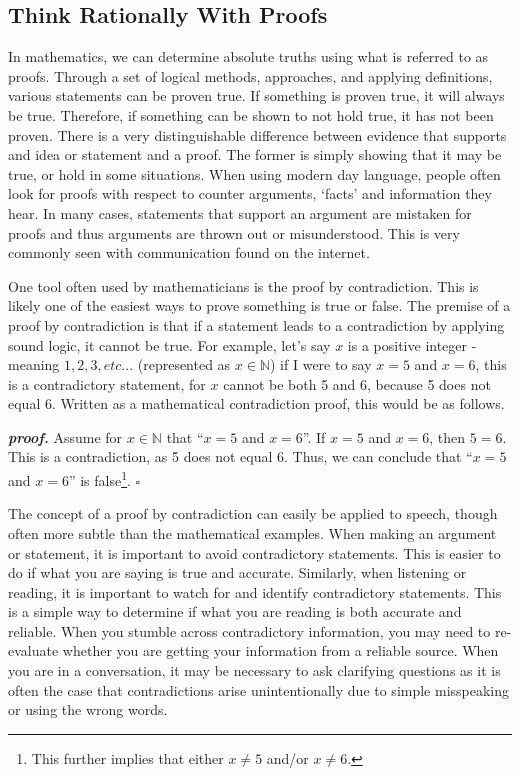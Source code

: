 \documentclass[10pt, a4paper, twocolumn]{book}
\begin{document}
\subsection{Think Rationally With Proofs}

In mathematics, we can determine absolute truths using what is referred to as proofs. Through a set of logical methods, approaches, and applying definitions, various statements can be proven true. If something is proven true, it will always be true. Therefore, if something can be shown to not hold true, it has not been proven. There is a very distinguishable difference between evidence that supports and idea or statement and a proof. The former is simply showing that it may be true, or hold in some situations. When using modern day language, people often look for proofs with respect to counter arguments, `facts' and information they hear. In many cases, statements that support an argument are mistaken for proofs and thus arguments are thrown out or misunderstood. This is very commonly seen with communication found on the internet.

One tool often used by mathematicians is the proof by contradiction. This is likely one of the easiest ways to prove something is true or false. The premise of a proof by contradiction is that if a statement leads to a contradiction by applying sound logic, it cannot be true. For example, let's say $x$ is a positive integer - meaning $1,2,3,etc...$ (represented as $x \in \mathbb{N}$) if I were to say $x=5$ and $x=6$, this is a contradictory statement, for $x$ cannot be both 5 and 6, because 5 does not equal 6. Written as a mathematical contradiction proof, this would be as follows.

\begin{fancybox}{}
	\textit{\textbf{proof.}} Assume for $x \in \mathbb{N}$ that ``$x=5$ and $x=6$''. If $x=5$ and $x=6$, then $5=6$. This is a contradiction, as 5 does not equal 6. Thus, we can conclude that ``$x=5$ and $x=6$'' is false\footnote{This further implies that either $x\neq5$ and/or $x\neq6$.}. $\square$
\end{fancybox}

The concept of a proof by contradiction can easily be applied to speech, though often more subtle than the mathematical examples. When making an argument or statement, it is important to avoid contradictory statements. This is easier to do if what you are saying is true and accurate. Similarly, when listening or reading, it is important to watch for and identify contradictory statements. This is a simple way to determine if what you are reading is both accurate and reliable. When you stumble across contradictory information, you may need to re-evaluate whether you are getting your information from a reliable source. When you are in a conversation, it may be necessary to ask clarifying questions as it is often the case that contradictions arise unintentionally due to simple misspeaking or using the wrong words. 
\end{document}

